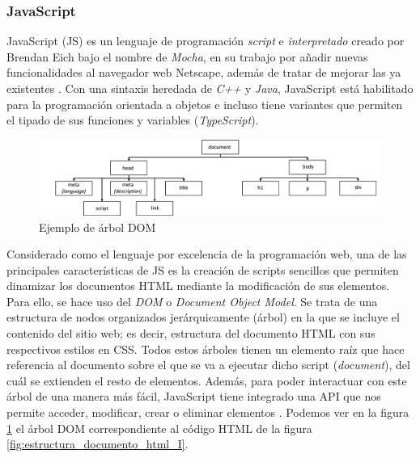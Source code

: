 \documentclass[../main.tex]{subfiles}
\begin{document}
    \subsubsection{JavaScript}
    JavaScript (JS) es un lenguaje de programación \textit{script} e \textit{interpretado} creado por Brendan Eich bajo el nombre de \textit{Mocha}, en su trabajo por añadir nuevas funcionalidades al navegador web Netscape, además de tratar de mejorar las ya existentes \cite{elocuentJS}. Con una sintaxis heredada de \textit{C++} y \textit{Java}, JavaScript está habilitado para la programación orientada a objetos e incluso tiene variantes que permiten el tipado de sus funciones y variables (\textit{TypeScript}). \\
    
    \begin{figure}[!h]
        \centering
        \includegraphics[width=\textwidth]{images/arbol_dom_ejemplo.png}
        \caption{Ejemplo de árbol DOM}
        \label{fig::arbol_dom_ejemplo}
    \end{figure}
    
    Considerado como el lenguaje por excelencia de la programación web, una de las principales características de JS es la creación de scripts sencillos que permiten dinamizar los documentos HTML mediante la modificación de sus elementos. Para ello, se hace uso del \textit{DOM} o \textit{Document Object Model}. Se trata de una estructura de nodos organizados jerárquicamente (árbol) en la que se incluye el contenido del sitio web; es decir, estructura del documento HTML con sus respectivos estilos en CSS. Todos estos árboles tienen un elemento raíz que hace referencia al documento sobre el que se va a ejecutar dicho script (\textit{document}), del cuál se extienden el resto de elementos. Además, para poder interactuar con este árbol de una manera más fácil, JavaScript tiene integrado una API que nos permite acceder, modificar, crear o eliminar elementos \cite{javaScriptDOM}. Podemos ver en la figura \ref{fig::arbol_dom_ejemplo} el árbol DOM correspondiente al código HTML de la figura \ref{fig:estructura_documento_html_I}.\\
    
\end{document}
